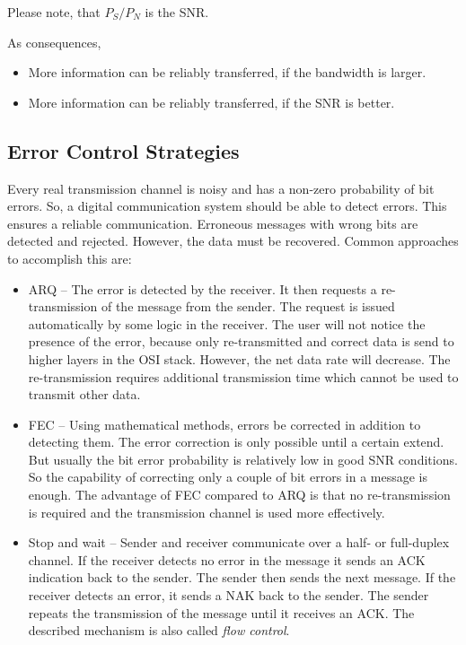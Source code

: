 \begin{refsection}
Please note, that $P_S/P_N$ is the \ac{SNR}.

As consequences,
\begin{itemize}
	\item More information can be reliably transferred, if the bandwidth is larger.
	\item More information can be reliably transferred, if the \ac{SNR} is better.
\end{itemize}


\subsection{Error Control Strategies}

Every real transmission channel is noisy and has a non-zero probability of bit errors. So, a digital communication system should be able to detect errors. This ensures a reliable communication. Erroneous messages with wrong bits are detected and rejected. However, the data must be recovered. Common approaches to accomplish this are:
\begin{itemize}
	\item \acf{ARQ} -- The error is detected by the receiver. It then requests a re-transmission of the message from the sender. The request is issued automatically by some logic in the receiver. The user will not notice the presence of the error, because only re-transmitted and correct data is send to higher layers in the \ac{OSI} stack. However, the net data rate will decrease. The re-transmission requires additional transmission time which cannot be used to transmit other data.
	\item \acf{FEC} -- Using mathematical methods, errors be corrected in addition to detecting them. The error correction is only possible until a certain extend. But usually the bit error probability is relatively low in good \ac{SNR} conditions. So the capability of correcting only a couple of bit errors in a message is enough. The advantage of \ac{FEC} compared to \ac{ARQ} is that no re-transmission is required and the transmission channel is used more effectively.
	\item Stop and wait -- Sender and receiver communicate over a half- or full-duplex channel. If the receiver detects no error in the message it sends an \ac{ACK} indication back to the sender. The sender then sends the next message. If the receiver detects an error, it sends a \ac{NAK} back to the sender. The sender repeats the transmission of the message until it receives an \ac{ACK}. The described mechanism is also called \emph{flow control}.
\end{itemize}


\end{refsection}
